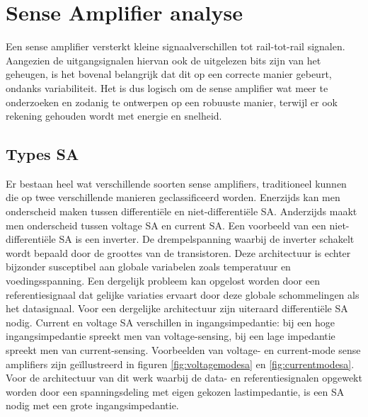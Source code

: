 \chapter{Sense Amplifier analyse}
\label{sensamp}
Een sense amplifier versterkt kleine signaalverschillen tot rail-tot-rail signalen. Aangezien de uitgangsignalen hiervan ook de uitgelezen bits zijn van het geheugen, is het bovenal belangrijk dat dit op een correcte manier gebeurt, ondanks variabiliteit.
Het is dus logisch om de sense amplifier wat meer te onderzoeken en zodanig te ontwerpen op een robuuste manier, terwijl er ook rekening gehouden wordt met energie en snelheid.

\section{Types SA}
Er bestaan heel wat verschillende soorten sense amplifiers, traditioneel kunnen die op twee verschillende manieren geclassificeerd worden. Enerzijds kan men onderscheid maken tussen differentiële en niet-differentiële SA. Anderzijds maakt men onderscheid tussen voltage SA en current SA. Een voorbeeld van een niet-differentiële SA is een inverter. De drempelspanning waarbij de inverter schakelt wordt bepaald door de groottes van de transistoren. Deze architectuur is echter bijzonder susceptibel aan globale variabelen zoals temperatuur en voedingsspanning. Een dergelijk probleem kan opgelost worden door een referentiesignaal dat gelijke variaties ervaart door deze globale schommelingen als het datasignaal. Voor een dergelijke architectuur zijn uiteraard differentiële SA nodig. Current en voltage SA verschillen in ingangsimpedantie: bij een hoge ingangsimpedantie spreekt men van voltage-sensing, bij een lage impedantie spreekt men van current-sensing. Voorbeelden van voltage- en current-mode sense amplifiers zijn geïllustreerd in figuren \ref{fig:voltagemodesa} en \ref{fig:currentmodesa}. Voor de architectuur van dit werk waarbij de data- en referentiesignalen opgewekt worden door een spanningsdeling met eigen gekozen lastimpedantie, is een SA nodig met een grote ingangsimpedantie.

